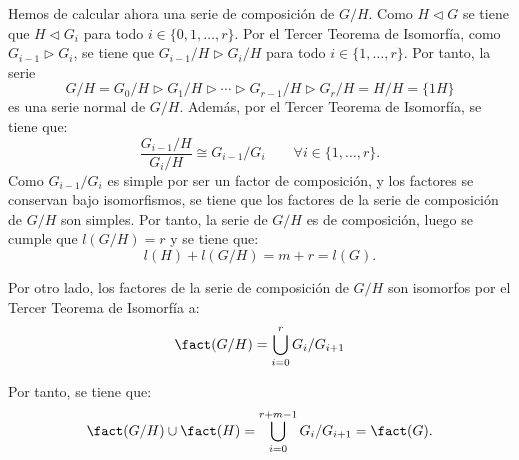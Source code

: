 \begin{ejercicio}
    
    Hemos de calcular ahora una serie de composición de $G/H$. Como $H\lhd G$ se tiene que $H\lhd G_i$ para todo $i\in \{0,1,\ldots,r\}$. Por el Tercer Teorema de Isomorfía, como $G_{i-1}\rhd G_i$, se tiene que $G_{i-1}/H \rhd G_i/H$ para todo $i\in \{1,\ldots,r\}$. Por tanto, la serie
    \[
        G/H = G_0/H \rhd G_1/H \rhd \cdots \rhd G_{r-1}/H \rhd G_r/H = H/H = \{1H\}
    \]
    es una serie normal de $G/H$. Además, por el Tercer Teorema de Isomorfía, se tiene que:
    \begin{equation*}
        \dfrac{G_{i-1}/H}{G_i/H} \cong {G_{i-1}/}{G_i} \qquad \forall i\in \{1,\ldots,r\}.
    \end{equation*}
    Como $G_{i-1}/G_i$ es simple por ser un factor de composición, y los factores se conservan bajo isomorfismos, se tiene que los factores de la serie de composición de $G/H$ son simples. Por tanto, la serie de $G/H$ es de composición, luego se cumple que $l(G/H)=r$ y se tiene que:
    \begin{equation*}
        l(H) + l(G/H) = m + r = l(G).
    \end{equation*}

    Por otro lado, los factores de la serie de composición de $G/H$ son isomorfos por el Tercer Teorema de Isomorfía a:
    \begin{equation*}
        \fact(G/H)=\bigcup_{i=0}^r G_i/G_{i+1}
    \end{equation*}

    Por tanto, se tiene que:
    \begin{equation*}
        \fact(G/H)\cup \fact(H) = \bigcup_{i=0}^{r+m-1} G_i/G_{i+1} = \fact(G).
    \end{equation*}
\end{ejercicio}

